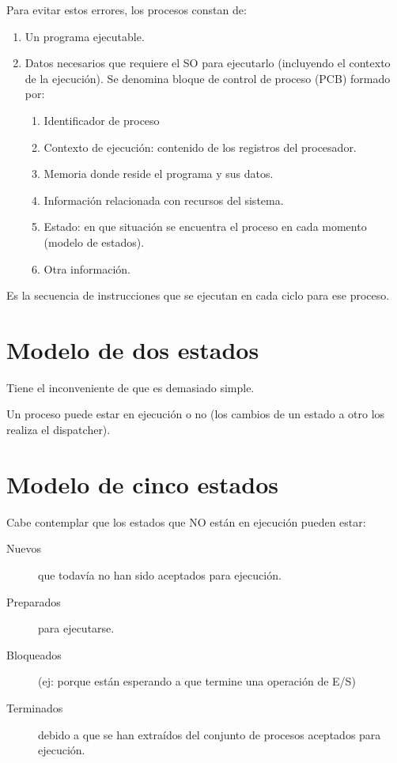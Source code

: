 \begin{definicion}[Proceso]
    Para evitar estos errores, los procesos constan de:
    \begin{enumerate}
        \item Un programa ejecutable.
        \item Datos necesarios que requiere el SO para ejecutarlo (incluyendo el contexto de la ejecución). Se denomina bloque de control de proceso (PCB) formado por:
        \begin{enumerate}
            \item Identificador de proceso
            \item Contexto de ejecución: contenido de los registros del procesador.
            \item Memoria donde reside el programa y sus datos.
            \item Información relacionada con recursos del sistema.
            \item Estado: en que situación se encuentra el proceso en cada momento (modelo de estados).
            \item Otra información.
        \end{enumerate}
    \end{enumerate}
\end{definicion}

\begin{definicion}
    Es la secuencia de instrucciones que se ejecutan en cada ciclo para ese proceso.
\end{definicion}

\section{Modelo de dos estados}
Tiene el inconveniente de que es demasiado simple.

Un proceso puede estar en ejecución o no (los cambios de un estado a otro los realiza el dispatcher).

\section{Modelo de cinco estados}
    Cabe contemplar que los estados que NO están en ejecución pueden estar:
    \begin{description}
        \item[Nuevos] que todavía no han sido aceptados para ejecución. 
        \item[Preparados] para ejecutarse.
        \item[Bloqueados] (ej: porque están esperando a que termine una operación de E/S)
        \item[Terminados] debido a que se han extraídos del conjunto de procesos aceptados para ejecución.
    \end{description}

